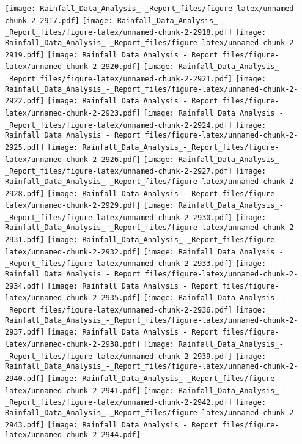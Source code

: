 \documentclass[
]{article}
\begin{document}
\texttt{[image: Rainfall\_Data\_Analysis\_-\_Report\_files/figure-latex/unnamed-chunk-2-2917.pdf]}
\texttt{[image: Rainfall\_Data\_Analysis\_-\_Report\_files/figure-latex/unnamed-chunk-2-2918.pdf]}
\texttt{[image: Rainfall\_Data\_Analysis\_-\_Report\_files/figure-latex/unnamed-chunk-2-2919.pdf]}
\texttt{[image: Rainfall\_Data\_Analysis\_-\_Report\_files/figure-latex/unnamed-chunk-2-2920.pdf]}
\texttt{[image: Rainfall\_Data\_Analysis\_-\_Report\_files/figure-latex/unnamed-chunk-2-2921.pdf]}
\texttt{[image: Rainfall\_Data\_Analysis\_-\_Report\_files/figure-latex/unnamed-chunk-2-2922.pdf]}
\texttt{[image: Rainfall\_Data\_Analysis\_-\_Report\_files/figure-latex/unnamed-chunk-2-2923.pdf]}
\texttt{[image: Rainfall\_Data\_Analysis\_-\_Report\_files/figure-latex/unnamed-chunk-2-2924.pdf]}
\texttt{[image: Rainfall\_Data\_Analysis\_-\_Report\_files/figure-latex/unnamed-chunk-2-2925.pdf]}
\texttt{[image: Rainfall\_Data\_Analysis\_-\_Report\_files/figure-latex/unnamed-chunk-2-2926.pdf]}
\texttt{[image: Rainfall\_Data\_Analysis\_-\_Report\_files/figure-latex/unnamed-chunk-2-2927.pdf]}
\texttt{[image: Rainfall\_Data\_Analysis\_-\_Report\_files/figure-latex/unnamed-chunk-2-2928.pdf]}
\texttt{[image: Rainfall\_Data\_Analysis\_-\_Report\_files/figure-latex/unnamed-chunk-2-2929.pdf]}
\texttt{[image: Rainfall\_Data\_Analysis\_-\_Report\_files/figure-latex/unnamed-chunk-2-2930.pdf]}
\texttt{[image: Rainfall\_Data\_Analysis\_-\_Report\_files/figure-latex/unnamed-chunk-2-2931.pdf]}
\texttt{[image: Rainfall\_Data\_Analysis\_-\_Report\_files/figure-latex/unnamed-chunk-2-2932.pdf]}
\texttt{[image: Rainfall\_Data\_Analysis\_-\_Report\_files/figure-latex/unnamed-chunk-2-2933.pdf]}
\texttt{[image: Rainfall\_Data\_Analysis\_-\_Report\_files/figure-latex/unnamed-chunk-2-2934.pdf]}
\texttt{[image: Rainfall\_Data\_Analysis\_-\_Report\_files/figure-latex/unnamed-chunk-2-2935.pdf]}
\texttt{[image: Rainfall\_Data\_Analysis\_-\_Report\_files/figure-latex/unnamed-chunk-2-2936.pdf]}
\texttt{[image: Rainfall\_Data\_Analysis\_-\_Report\_files/figure-latex/unnamed-chunk-2-2937.pdf]}
\texttt{[image: Rainfall\_Data\_Analysis\_-\_Report\_files/figure-latex/unnamed-chunk-2-2938.pdf]}
\texttt{[image: Rainfall\_Data\_Analysis\_-\_Report\_files/figure-latex/unnamed-chunk-2-2939.pdf]}
\texttt{[image: Rainfall\_Data\_Analysis\_-\_Report\_files/figure-latex/unnamed-chunk-2-2940.pdf]}
\texttt{[image: Rainfall\_Data\_Analysis\_-\_Report\_files/figure-latex/unnamed-chunk-2-2941.pdf]}
\texttt{[image: Rainfall\_Data\_Analysis\_-\_Report\_files/figure-latex/unnamed-chunk-2-2942.pdf]}
\texttt{[image: Rainfall\_Data\_Analysis\_-\_Report\_files/figure-latex/unnamed-chunk-2-2943.pdf]}
\texttt{[image: Rainfall\_Data\_Analysis\_-\_Report\_files/figure-latex/unnamed-chunk-2-2944.pdf]}
\end{document}
